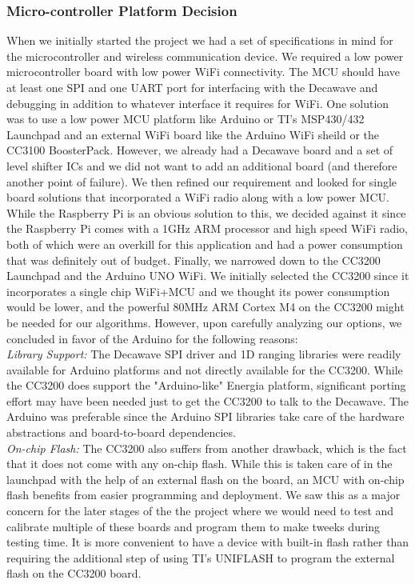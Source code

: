 \documentclass[journal,transmag]{IEEEtran}
\begin{document}
\subsubsection{Micro-controller Platform Decision}
When we initially started the project we had a set of specifications in mind for the microcontroller and wireless communication device.  We required a low power microcontroller board with low power WiFi connectivity.  The MCU should have at least one SPI and one UART port for interfacing with the Decawave and debugging in addition to whatever interface it requires for WiFi.  One solution was to use a low power MCU platform like Arduino or TI's MSP430/432 Launchpad and an external WiFi board like the Arduino WiFi sheild or the CC3100 BoosterPack.  However, we already had a Decawave board and a set of level shifter ICs and we did not want to add an additional board (and therefore another point of failure).  We then refined our requirement and looked for single board solutions that incorporated a WiFi radio along with a low power MCU.  While the Raspberry Pi is an obvious solution to this, we decided against it since the Raspberry Pi comes with a 1GHz ARM processor and high speed WiFi radio, both of which were an overkill for this application and had a power consumption that was definitely out of budget.  Finally, we narrowed down to the CC3200 Launchpad and the Arduino UNO WiFi.  We initially selected the CC3200 since it incorporates a single chip WiFi+MCU and we thought its power consumption would be lower, and the powerful 80MHz ARM Cortex M4 on the CC3200 might be needed for our algorithms.  However, upon carefully analyzing our options, we concluded in favor of the Arduino for the following reasons:\\

\textit{Library Support:}
The Decawave SPI driver and 1D ranging libraries were readily available for Arduino platforms and not directly available for the CC3200.  While the CC3200 does support the "Arduino-like" Energia platform, significant porting effort may have been needed just to get the CC3200 to talk to the Decawave.  The Arduino was preferable since the Arduino SPI libraries take care of the hardware abstractions and board-to-board dependencies.\\

\textit{On-chip Flash:}
The CC3200 also suffers from another drawback, which is the fact that it does not come with any on-chip flash.  While this is taken care of in the launchpad with the help of an external flash on the board, an MCU with on-chip flash benefits from easier programming and deployment.  We saw this as a major concern for the later stages of the the project where we would need to test and calibrate multiple of these boards and program them to make tweeks during testing time.  It is more convenient to have a device with built-in flash rather than requiring the additional step of using TI's UNIFLASH to program the external flash on the CC3200 board.\\
\end{document}
